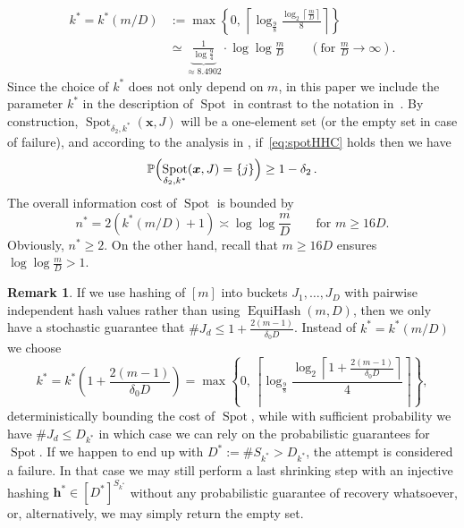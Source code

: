 \documentclass[12pt]{article}
\theoremstyle{plain}
\theoremstyle{definition}
\newtheorem{remark}[theorem]{Remark}
\renewcommand{\P}{{\mathbb P}}
\DeclareMathOperator{\EquiHash}{EquiHash}
\renewcommand{\vec}{\boldsymbol}
\DeclareMathOperator{\spot}{Spot}
\begin{document}
\begin{align}
    k^\ast = k^\ast(m/D)
        &:= \max\left\{0,\, \left\lceil \log_{\frac98} \frac{\log_2 \left\lceil \frac{m}{D} \right\rceil}{8} \right\rceil 
                \right\} 
        \label{eq:k*}\\ 
    &\simeq \underbrace{\frac{1}{\log\frac{9}{4}}}_{\approx 8.4902} \cdot \log \log \frac{m}{D}
    \qquad\left(\text{for } \frac{m}{D} \to \infty\right). \nonumber
\end{align}
Since the choice of $k^\ast$ does not only depend on $m$,
in this paper we include the parameter $k^\ast$ in the description of $\spot$ in contrast to the notation in~\cite{KW24b}.
By construction, $\spot_{\delta_2,k^\ast}(\vec{x},J)$ will be a one-element set
(or the empty set in case of failure), and according to the analysis in \cite[Sec~2.3]{KW24b},
if~\eqref{eq:spotHHC} holds then we have
\begin{equation*}
    \P\Bigl(\spot_{\delta_2,k^\ast}(\vec{x},J) = \{j\}\Bigr) \geq 1 - \delta_2 \,.
\end{equation*}
The overall information cost of $\spot$ is bounded by
\begin{equation} \label{eq:n*}
    n^\ast = 2(k^\ast(m/D) + 1)
        \asymp \log \log \frac{m}{D}
        \qquad\text{for } m\geq 16D.
\end{equation}
Obviously, $n^\ast \geq 2$. On the other hand, recall that $m \geq 16D$ ensures $\log \log \frac{m}{D} > 1$.

\begin{remark}
    If we use hashing of $[m]$ into buckets $J_1,\ldots,J_D$ with pairwise independent hash values rather than using $\EquiHash(m,D)$,
    then we only have a stochastic guarantee that $\#J_d \leq 1 + \frac{2(m-1)}{\delta_0 D}$.
    Instead of $k^\ast = k^\ast(m/D)$ we choose
    \begin{equation*}
        k^\ast 
            = k^\ast\left(1 + \frac{2(m-1)}{\delta_0 D}\right)
            = \max\left\{0,\, \left\lceil \log_{\frac98} \frac{\log_2 \left\lceil 1 + \frac{2(m-1)}{\delta_0 D} \right\rceil}{4} \right\rceil \right\},
    \end{equation*}
    deterministically bounding the cost of $\spot$,
    while with sufficient probability we have $\#J_d \leq D_{k^\ast}$
    in which case we can rely on the probabilistic guarantees for $\spot$. 
    If we happen to end up with $D^\ast := \# S_{k^\ast} > D_{k^\ast}$,
    the attempt is considered a failure.
    In that case we may still perform a last shrinking step with an injective hashing
    $\vec{h}^\ast \in [D^\ast]^{S_{k^\ast}}$
    without any probabilistic guarantee of recovery whatsoever,
    or, alternatively, we may simply return the empty set.
\end{remark}
\end{document}

